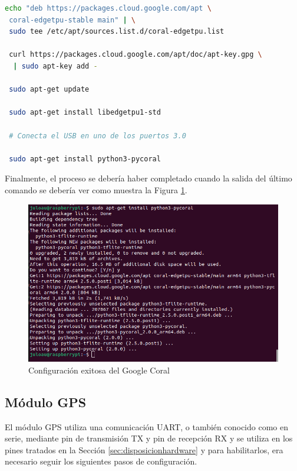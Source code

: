 \begin{lstlisting}[language=bash]
 echo "deb https://packages.cloud.google.com/apt \
 coral-edgetpu-stable main" | \
 sudo tee /etc/apt/sources.list.d/coral-edgetpu.list

 curl https://packages.cloud.google.com/apt/doc/apt-key.gpg \
  | sudo apt-key add -

 sudo apt-get update	

 sudo apt-get install libedgetpu1-std

 # Conecta el USB en uno de los puertos 3.0

 sudo apt-get install python3-pycoral
\end{lstlisting}

Finalmente, el proceso se debería haber completado cuando la salida del último comando se debería ver como muestra la Figura \ref{fig:outcoral}.

 \begin{figure} [h!]
	\begin{center}
		\includegraphics[width=12cm]{figs/cap6/pycoralinstalled.png}
	\end{center}
	\caption{Configuración exitosa del Google Coral}
	\label{fig:outcoral}
\end{figure}


\subsection{Módulo GPS}
\label{subsec:configgps}

El módulo \acs{GPS} utiliza una comunicación \ac{UART}, o también conocido como en serie, mediante pin de transmisión TX y pin de recepción RX y se utiliza en los pines tratados en la Sección \ref{sec:disposicionhardware} y para habilitarlos, era necesario seguir los siguientes pasos de configuración.

